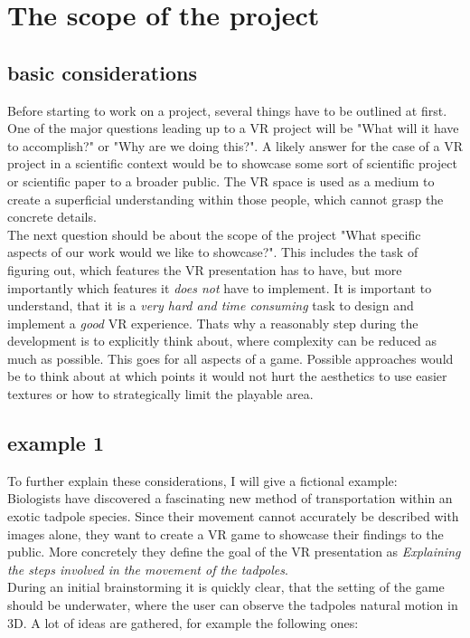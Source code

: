 \section{The scope of the project}

\subsection{basic considerations}

Before starting to work on a project, several things have to be outlined at first. One of the major questions leading up to a VR project will be "What will it have to accomplish?" or "Why are we doing this?". A likely answer for the case of a VR project in a scientific context would be to showcase some sort of scientific project or scientific paper to a broader public. The VR space is used as a medium to create a superficial understanding within those people, which cannot grasp the concrete details.\\
The next question should be about the scope of the project "What specific aspects of our work would we like to showcase?". This includes the task of figuring out, which features the VR presentation has to have, but more importantly which features it \textit{does not} have to implement. It is important to understand, that it is a \textit{very hard and time consuming} task to design and implement a \textit{good} VR experience. Thats why a reasonably step during the development is to explicitly think about, where complexity can be reduced as much as possible. This goes for all aspects of a game. Possible approaches would be to think about at which points it would not hurt the aesthetics to use easier textures or how to strategically limit the playable area.\\

\subsection{example 1}

To further explain these considerations, I will give a fictional example:\\
Biologists have discovered a fascinating new method of transportation within an exotic tadpole species. Since their movement cannot accurately be described with images alone, they want to create a VR game to showcase their findings to the public. More concretely they define the goal of the VR presentation as \textit{Explaining the steps involved in the movement of the tadpoles}.\\
During an initial brainstorming it is quickly clear, that the setting of the game should be underwater, where the user can observe the tadpoles natural motion in 3D. A lot of ideas are gathered, for example the following ones:

